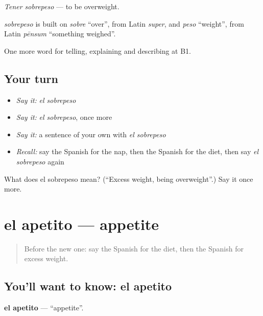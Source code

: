 \emph{Tener sobrepeso} — to be overweight.

\begin{cousinweb}
\emph{sobrepeso} is built on \emph{sobre} \textquotedblleft{}over\textquotedblright{}, from Latin \emph{super}, and \emph{peso} \textquotedblleft{}weight\textquotedblright{}, from Latin \emph{pēnsum} \textquotedblleft{}something weighed\textquotedblright{}.
\end{cousinweb}

\begin{grammarlens}[title={What you've built}]
One more word for telling, explaining and describing at B1.
\end{grammarlens}

\subsection*{Your turn}
\begin{itemize}
\raggedright
  \item \emph{Say it:} \emph{el sobrepeso}
  \item \emph{Say it:} \emph{el sobrepeso}, once more
  \item \emph{Say it:} a sentence of your own with \emph{el sobrepeso}
  \item \emph{Recall:} say the Spanish for the nap, then the Spanish for the diet, then say \emph{el sobrepeso} again
\end{itemize}

\begin{tcolorbox}[breakable,colback=teal!4,colframe=teal!35!black,title={Before you move on}]
What does el sobrepeso mean? (\textquotedblleft{}Excess weight, being overweight\textquotedblright{}.) Say it once more.
\end{tcolorbox}
\section[el apetito]{el apetito — appetite}

\label{lesson:ES-C742-apetito}



\begin{quote}
Before the new one: say the Spanish for the diet, then the Spanish for excess weight.
\end{quote}

\subsection*{You'll want to know: el apetito}
\textbf{el apetito} — \textquotedblleft{}appetite\textquotedblright{}.

